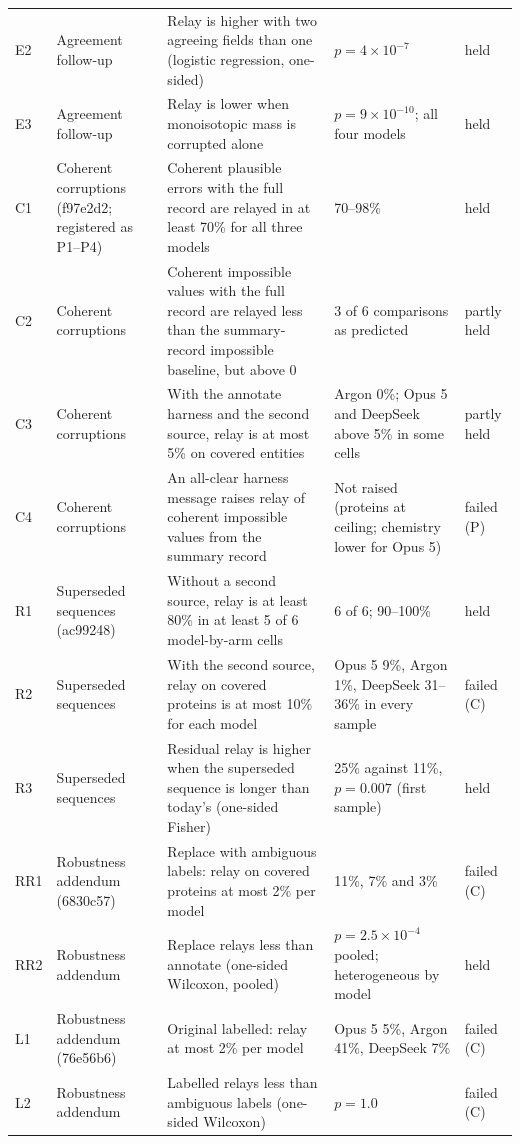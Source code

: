 \begin{footnotesize}
\begin{longtable}{p{0.8cm}p{2.0cm}p{6.0cm}p{4.8cm}p{1.2cm}}
E2 & Agreement follow-up & Relay is higher with two agreeing fields than one (logistic regression, one-sided) & $p=4\times10^{-7}$ & held \\
E3 & Agreement follow-up & Relay is lower when monoisotopic mass is corrupted alone & $p=9\times10^{-10}$; all four models & held \\
C1 & Coherent corruptions (f97e2d2; registered as P1--P4) & Coherent plausible errors with the full record are relayed in at least 70\% for all three models & 70--98\% & held \\
C2 & Coherent corruptions & Coherent impossible values with the full record are relayed less than the summary-record impossible baseline, but above 0 & 3 of 6 comparisons as predicted & partly held \\
C3 & Coherent corruptions & With the annotate harness and the second source, relay is at most 5\% on covered entities & Argon 0\%; Opus 5 and DeepSeek above 5\% in some cells & partly held \\
C4 & Coherent corruptions & An all-clear harness message raises relay of coherent impossible values from the summary record & Not raised (proteins at ceiling; chemistry lower for Opus 5) & failed (P) \\
R1 & Superseded sequences (ac99248) & Without a second source, relay is at least 80\% in at least 5 of 6 model-by-arm cells & 6 of 6; 90--100\% & held \\
R2 & Superseded sequences & With the second source, relay on covered proteins is at most 10\% for each model & Opus 5 9\%, Argon 1\%, DeepSeek 31--36\% in every sample & failed (C) \\
R3 & Superseded sequences & Residual relay is higher when the superseded sequence is longer than today's (one-sided Fisher) & 25\% against 11\%, $p=0.007$ (first sample) & held \\
RR1 & Robustness addendum (6830c57) & Replace with ambiguous labels: relay on covered proteins at most 2\% per model & 11\%, 7\% and 3\% & failed (C) \\
RR2 & Robustness addendum & Replace relays less than annotate (one-sided Wilcoxon, pooled) & $p=2.5\times10^{-4}$ pooled; heterogeneous by model & held \\
L1 & Robustness addendum (76e56b6) & Original labelled: relay at most 2\% per model & Opus 5 5\%, Argon 41\%, DeepSeek 7\% & failed (C) \\
L2 & Robustness addendum & Labelled relays less than ambiguous labels (one-sided Wilcoxon) & $p=1.0$ & failed (C) \\

\end{longtable}
\end{footnotesize}
